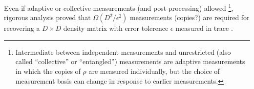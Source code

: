 \documentclass[
aps,
pra,
twocolumn,
floatfix,
]{revtex4-2}
\theoremstyle{plain}
\theoremstyle{definition}
\newcommand{\ob}{O}
\newcommand{\dm}{\rho}
\newcommand{\bmsigma}{\bm{\sigma}}
\begin{document}
Even if adaptive or collective measurements (and post-processing) allowed 
\footnote{Intermediate between independent measurements and unrestricted (also called “collective” or “entangled”) measurements are adaptive measurements in which the copies of $\dm$ are measured individually, but the choice of measurement basis can change in response to earlier measurements.},
rigorous analysis \cite{haahSampleoptimalTomographyQuantum2017} \cite{odonnellEfficientQuantumTomography2016} proved that 
$\Omega(D^2/\epsilon^2)$ measurements (copies?)  are required for recovering a $D\times D$ density matrix
with error tolerence $\epsilon$ measured in trace .
\end{document}
